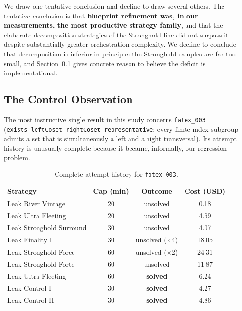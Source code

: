 \documentclass[12pt, a4paper]{article}
\begin{document}
We draw one tentative conclusion and decline to draw several others. The
tentative conclusion is that \textbf{blueprint refinement was, in our
measurements, the most productive strategy family}, and that the elaborate
decomposition strategies of the Stronghold line did not surpass it despite
substantially greater orchestration complexity. We decline to conclude that
decomposition is inferior in principle: the Stronghold samples are far too
small, and Section~\ref{sec:control-observation} gives concrete reason to
believe the deficit is implementational.

\subsection{The Control Observation}
\label{sec:control-observation}

The most instructive single result in this study concerns
\texttt{fatex\_003} (\texttt{exists\_leftCoset\_rightCoset\_representative}:
every finite-index subgroup admits a set that is simultaneously a left and a
right transversal). Its attempt history is unusually complete because it
became, informally, our regression problem.

\begin{table}[H]
  \centering
  \caption{Complete attempt history for \texttt{fatex\_003}.}
  \label{tab:fatex003}
  \renewcommand{\arraystretch}{1.25}
  \begin{tabular}{lccc}
    \toprule
    Strategy & Cap (min) & Outcome & Cost (USD) \\
    \midrule
    Leak River Vintage       & 20 & unsolved & 0.18 \\
    Leak Ultra Fleeting      & 20 & unsolved & 4.69 \\
    Leak Stronghold Surround & 30 & unsolved & 4.07 \\
    Leak Finality I          & 30 & unsolved ($\times$4) & 18.05 \\
    Leak Stronghold Force    & 60 & unsolved ($\times$2) & 24.31 \\
    Leak Stronghold Forte    & 60 & unsolved & 11.87 \\
    \midrule
    Leak Ultra Fleeting      & 60 & \textbf{solved} & 6.24 \\
    Leak Control I           & 30 & \textbf{solved} & 4.27 \\
    Leak Control II          & 30 & \textbf{solved} & 4.86 \\
    \bottomrule
  \end{tabular}
\end{table}
\end{document}
